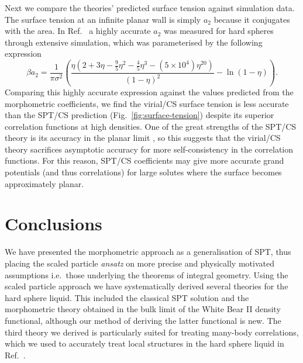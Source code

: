\documentclass[11pt,twoside]{report}
\begin{document}
Next we compare the theories' predicted surface tension against simulation data.
The surface tension at an infinite planar wall is simply $a_2$ because it conjugates with the area.
In Ref.\ \cite{DavidchackMP2015} a highly accurate $a_2$ was measured for hard spheres through extensive simulation, which was parameterised by the following expression
\begin{equation}\label{eq:quasi-exact-surface-tension}
  \beta a_2
  =
  \frac{1}{\pi \sigma^2} \left(
  \frac{\eta (2 + 3\eta - \frac{9}{5}\eta^2 - \frac{4}{5}\eta^3 - (5 \times 10^4) \eta^{20})}{(1 - \eta)^2}
  - \ln{(1 - \eta)}
  \right).
\end{equation}
Comparing this highly accurate expression against the values predicted from the morphometric coefficients, we find the virial/CS surface tension is less accurate than the SPT/CS prediction (Fig.\ \ref{fig:surface-tension}) despite its superior correlation functions at high densities.
One of the great strengths of the SPT/CS theory is its accuracy in the planar limit \cite{Hansen-GoosJPCM2006}, so this suggests that the virial/CS theory sacrifices asymptotic accuracy for more self-consistency in the correlation functions.
For this reason, SPT/CS coefficients may give more accurate grand potentials (and thus correlations) for large solutes where the surface becomes approximately planar.

\section{Conclusions}

We have presented the morphometric approach as a generalisation of SPT, thus placing the scaled particle \emph{ansatz} on more precise and physically motivated assumptions i.e.\ those underlying the theorems of integral geometry.
Using the scaled particle approach we have systematically derived several theories for the hard sphere liquid.
This included the classical SPT solution and the morphometric theory obtained in the bulk limit of the White Bear II density functional, although our method of deriving the latter functional is new.
The third theory we derived is particularly suited for treating many-body correlations, which we used to accurately treat local structures in the hard sphere liquid in Ref.\ \cite{RobinsonPRL2019}.
\end{document}
